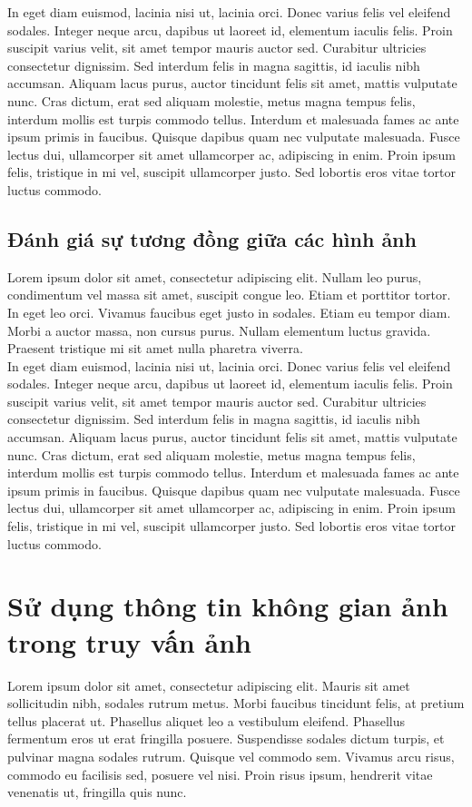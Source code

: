 In eget diam euismod, lacinia nisi ut, lacinia orci. Donec varius felis vel eleifend sodales. Integer neque arcu, dapibus ut laoreet id, elementum iaculis felis. Proin suscipit varius velit, sit amet tempor mauris auctor sed. Curabitur ultricies consectetur dignissim. Sed interdum felis in magna sagittis, id iaculis nibh accumsan. Aliquam lacus purus, auctor tincidunt felis sit amet, mattis vulputate nunc. Cras dictum, erat sed aliquam molestie, metus magna tempus felis, interdum mollis est turpis commodo tellus. Interdum et malesuada fames ac ante ipsum primis in faucibus. Quisque dapibus quam nec vulputate malesuada. Fusce lectus dui, ullamcorper sit amet ullamcorper ac, adipiscing in enim. Proin ipsum felis, tristique in mi vel, suscipit ullamcorper justo. Sed lobortis eros vitae tortor luctus commodo.\\
\subsection{Đánh giá sự tương đồng giữa các hình ảnh}

Lorem ipsum dolor sit amet, consectetur adipiscing elit. Nullam leo purus, condimentum vel massa sit amet, suscipit congue leo. Etiam et porttitor tortor. In eget leo orci. Vivamus faucibus eget justo in sodales. Etiam eu tempor diam. Morbi a auctor massa, non cursus purus. Nullam elementum luctus gravida. Praesent tristique mi sit amet nulla pharetra viverra.\\

In eget diam euismod, lacinia nisi ut, lacinia orci. Donec varius felis vel eleifend sodales. Integer neque arcu, dapibus ut laoreet id, elementum iaculis felis. Proin suscipit varius velit, sit amet tempor mauris auctor sed. Curabitur ultricies consectetur dignissim. Sed interdum felis in magna sagittis, id iaculis nibh accumsan. Aliquam lacus purus, auctor tincidunt felis sit amet, mattis vulputate nunc. Cras dictum, erat sed aliquam molestie, metus magna tempus felis, interdum mollis est turpis commodo tellus. Interdum et malesuada fames ac ante ipsum primis in faucibus. Quisque dapibus quam nec vulputate malesuada. Fusce lectus dui, ullamcorper sit amet ullamcorper ac, adipiscing in enim. Proin ipsum felis, tristique in mi vel, suscipit ullamcorper justo. Sed lobortis eros vitae tortor luctus commodo.\\
\section{Sử dụng thông tin không gian ảnh trong truy vấn ảnh}
\label{spatial}
Lorem ipsum dolor sit amet, consectetur adipiscing elit. Mauris sit amet sollicitudin nibh, sodales rutrum metus. Morbi faucibus tincidunt felis, at pretium tellus placerat ut. Phasellus aliquet leo a vestibulum eleifend. Phasellus fermentum eros ut erat fringilla posuere. Suspendisse sodales dictum turpis, et pulvinar magna sodales rutrum. Quisque vel commodo sem. Vivamus arcu risus, commodo eu facilisis sed, posuere vel nisi. Proin risus ipsum, hendrerit vitae venenatis ut, fringilla quis nunc.

